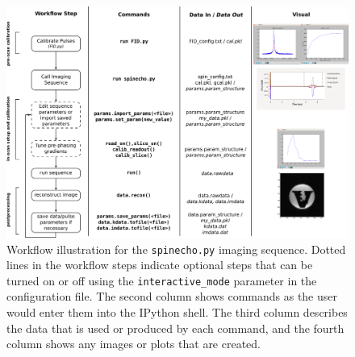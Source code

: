 \documentclass[10pt,letterpaper]{article}
\begin{document}
\begin{figure}[!ht]
\begin{center}
\includegraphics[width = \textwidth,trim=0 0 0 0,clip=false]{workflow.png}
\caption{Workflow illustration for the \texttt{spinecho.py} imaging sequence.  
Dotted lines in the workflow steps indicate optional steps that can be turned on or off using the \texttt{interactive\_mode} parameter in the configuration file.  
The second column shows commands 
as the user would enter them into the IPython shell.  
The third column describes the data that is used or produced by each command, 
and the fourth column shows any images or plots that are created.}
\label{fig:workflow}
\end{center}
\end{figure}
\end{document}
